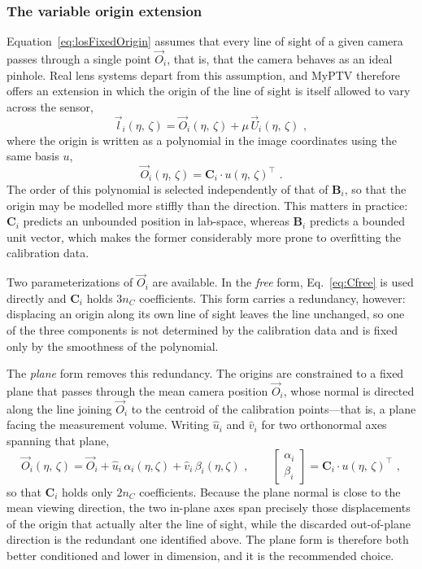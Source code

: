 \documentclass[10pt,a4paper]{article}
\begin{document}
\subsubsection{The variable origin extension}
Equation~\eqref{eq:losFixedOrigin} assumes that every line of sight of a given camera passes through a single point $\vec{O}_i$, that is, that the camera behaves as an ideal pinhole. Real lens systems depart from this assumption, and MyPTV therefore offers an extension in which the origin of the line of sight is itself allowed to vary across the sensor,
%
\begin{equation}
	\label{eq:losVariableOrigin}
	\vec l_i(\eta, \, \zeta) = \vec{O}_i(\eta, \, \zeta) + \mu\,\vec{U}_i(\eta, \, \zeta) \,\, ,
\end{equation}
%
where the origin is written as a polynomial in the image coordinates using the same basis $u$,
%
\begin{equation}
	\label{eq:Cfree}
	\vec{O}_i(\eta, \, \zeta) = \mathbf{C}_i \cdot u(\eta, \, \zeta)^\top \,\, .
\end{equation}
%
The order of this polynomial is selected independently of that of $\mathbf{B}_i$, so that the origin may be modelled more stiffly than the direction. This matters in practice: $\mathbf{C}_i$ predicts an unbounded position in lab-space, whereas $\mathbf{B}_i$ predicts a bounded unit vector, which makes the former considerably more prone to overfitting the calibration data.

Two parameterizations of $\vec{O}_i$ are available. In the \emph{free} form, Eq.~\eqref{eq:Cfree} is used directly and $\mathbf{C}_i$ holds $3 n_C$ coefficients. This form carries a redundancy, however: displacing an origin along its own line of sight leaves the line unchanged, so one of the three components is not determined by the calibration data and is fixed only by the smoothness of the polynomial.

The \emph{plane} form removes this redundancy. The origins are constrained to a fixed plane that passes through the mean camera position $\vec{O}_i$, whose normal is directed along the line joining $\vec{O}_i$ to the centroid of the calibration points---that is, a plane facing the measurement volume. Writing $\hat{u}_i$ and $\hat{v}_i$ for two orthonormal axes spanning that plane,
%
\begin{equation}
	\label{eq:Cplane}
	\vec{O}_i(\eta, \, \zeta) = \vec{O}_i + \hat{u}_i \, \alpha_i(\eta,\zeta) + \hat{v}_i \, \beta_i(\eta,\zeta) \,\, ,
	\qquad
	\begin{bmatrix} \alpha_i \\ \beta_i \end{bmatrix}
	= \mathbf{C}_i \cdot u(\eta, \, \zeta)^\top \,\, ,
\end{equation}
%
so that $\mathbf{C}_i$ holds only $2 n_C$ coefficients. Because the plane normal is close to the mean viewing direction, the two in-plane axes span precisely those displacements of the origin that actually alter the line of sight, while the discarded out-of-plane direction is the redundant one identified above. The plane form is therefore both better conditioned and lower in dimension, and it is the recommended choice.
\end{document}
